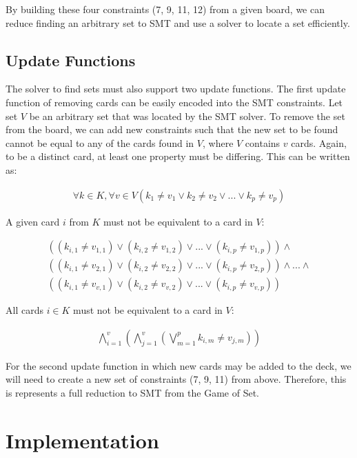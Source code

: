 \documentclass[pageno]{jpaper}
\begin{document}
By building these four constraints (7, 9, 11, 12) from a given board, we can reduce finding an arbitrary set to SMT and use a solver to locate a set efficiently. 

\subsection{Update Functions} 
The solver to find sets must also support two update functions. The first update function of removing cards can be easily encoded into the SMT constraints. Let set $V$ be an arbitrary set that was located by the SMT solver. To remove the set from the board, we can add new constraints such that the new set to be found cannot be equal to any of the cards found in $V$, where $V$ contains $v$ cards. Again, to be a distinct card, at least one property must be differing. This can be written as:

\begin{align}
	\forall k \in K, \forall v \in V \left (k_1 \neq v_1 \vee k_2 \neq v_2 \vee ... \vee k_p \neq v_p \right)
\end{align}

A given card $i$ from $K$ must not be equivalent to a card in $V$:

\begin{multline}
	((k_{i,1} \neq v_{1,1}) \vee (k_{i,2} \neq v_{1,2}) \vee ... \vee (k_{i,p} \neq v_{1,p})) \wedge \\
	 ((k_{i,1} \neq v_{2,1}) \vee (k_{i,2} \neq v_{2,2}) \vee ... \vee (k_{i,p} \neq v_{2,p}))  \wedge ... \wedge \\ ((k_{i,1} \neq v_{v,1}) \vee (k_{i,2} \neq v_{v,2}) \vee ... \vee (k_{i,p} \neq v_{v,p})) 
\end{multline}

All cards $i \in K$ must not be equivalent to a card in $V$:

\begin{align}
	\bigwedge \limits_{i=1}^{v}   \left( \bigwedge \limits_{j=1}^{v}  \left( \bigvee \limits_{m = 1}^{p} k_{i,m} \neq v_{j,m} \right)   \right)
\end{align}




For the second update function in which new cards may be added to the deck, we will need to create a new set of constraints (7, 9, 11) from above. Therefore, this is represents a full reduction to SMT from the Game of Set. 


\section{Implementation}
\end{document}
